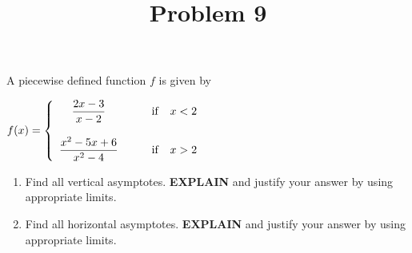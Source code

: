 \documentclass{ximera}
\title[Problem 9]{Problem 9}
\begin{document}
\begin{abstract} \end{abstract}
\maketitle

\begin{problem}
A  piecewise defined function $f$ is given by 
 
	$f(x) =   \left\{ \begin{array}{cl}
	\dfrac{2 x-3}{x-2}		 	&	\qquad \text{if }\hspace{0.1in}  x <  2	\\ \\
	\dfrac{x^2-5x +6}{x^2-4}	&	\qquad \text{if } \hspace{0.1in}   x>2 	
		
						\end{array} \right.  $\\[1em]

  \begin{enumerate}

	\item Find all vertical asymptotes.   \textbf{EXPLAIN} and justify your answer by using appropriate limits.\\[2em]
	\item Find all horizontal asymptotes. \textbf{EXPLAIN} and justify your answer by using appropriate limits.
\end{enumerate}
\end{problem}
\end{document}

